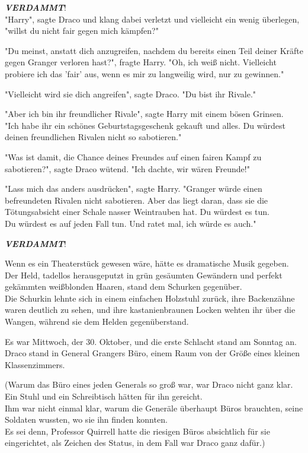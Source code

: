 {\textbf{\emph{VERDAMMT}}!\\ "Harry", sagte Draco und klang dabei verletzt und vielleicht ein wenig überlegen,\\ "willst du nicht fair gegen mich kämpfen?"

"Du meinst, anstatt dich anzugreifen, nachdem du bereits einen Teil deiner Kräfte gegen Granger verloren hast?", fragte Harry. "Oh, ich weiß nicht. Vielleicht probiere ich das 'fair' aus, wenn es mir zu langweilig wird, nur zu gewinnen."

"Vielleicht wird sie dich angreifen", sagte Draco. "Du bist ihr Rivale."

"Aber ich bin ihr freundlicher Rivale", sagte Harry mit einem bösen Grinsen.\\ "Ich habe ihr ein schönes Geburtstagsgeschenk gekauft und alles. Du würdest deinen freundlichen Rivalen nicht so sabotieren."

"Was ist damit, die Chance deines Freundes auf einen fairen Kampf zu sabotieren?", sagte Draco wütend. "Ich dachte, wir wären Freunde!"

"Lass mich das anders ausdrücken", sagte Harry. "Granger würde einen befreundeten Rivalen nicht sabotieren. Aber das liegt daran, dass sie die Tötungsabsicht einer Schale nasser Weintrauben hat. Du würdest es tun.\\ Du würdest es auf jeden Fall tun. Und ratet mal, ich würde es auch."

\textbf{\emph{VERDAMMT}}!

Wenn es ein Theaterstück gewesen wäre, hätte es dramatische Musik gegeben.\\ Der Held, tadellos herausgeputzt in grün gesäumten Gewändern und perfekt gekämmten weißblonden Haaren, stand dem Schurken gegenüber.\\ Die Schurkin lehnte sich in einem einfachen Holzstuhl zurück, ihre Backenzähne waren deutlich zu sehen, und ihre kastanienbraunen Locken wehten ihr über die Wangen, während sie dem Helden gegenüberstand.

Es war Mittwoch, der 30. Oktober, und die erste Schlacht stand am Sonntag an. Draco stand in General Grangers Büro, einem Raum von der Größe eines kleinen Klassenzimmers.

(Warum das Büro eines jeden Generals so groß war, war Draco nicht ganz klar. Ein Stuhl und ein Schreibtisch hätten für ihn gereicht.\\ Ihm war nicht einmal klar, warum die Generäle überhaupt Büros brauchten, seine Soldaten wussten, wo sie ihn finden konnten.\\ Es sei denn, Professor Quirrell hatte die riesigen Büros absichtlich für sie eingerichtet, als Zeichen des Status, in dem Fall war Draco ganz dafür.)

}
